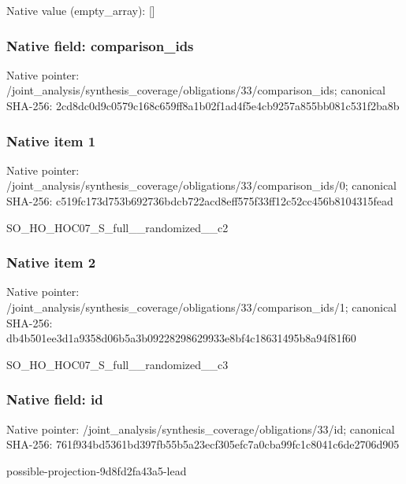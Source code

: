 \documentclass[10pt,a4paper]{article}
\begin{document}
Native value (empty\_\allowbreak{}array): []

\subsubsection{Native field: comparison\_\allowbreak{}ids}
Native pointer: /joint\_\allowbreak{}analysis/synthesis\_\allowbreak{}coverage/obligations/33/comparison\_\allowbreak{}ids; canonical SHA-256: 2cd8dc0d9c0579c168c659ff8a1b02f1ad4f5e4cb9257a855bb081c531f2ba8b

\subsubsection{Native item 1}
Native pointer: /joint\_\allowbreak{}analysis/synthesis\_\allowbreak{}coverage/obligations/33/comparison\_\allowbreak{}ids/0; canonical SHA-256: c519fc173d753b692736bdcb722acd8eff575f33ff12c52cc456b8104315fead

\begingroup\raggedright\sloppy SO\_\allowbreak{}HO\_\allowbreak{}HOC07\_\allowbreak{}S\_\allowbreak{}full\_\allowbreak{}\_\allowbreak{}randomized\_\allowbreak{}\_\allowbreak{}c2\par\endgroup

\subsubsection{Native item 2}
Native pointer: /joint\_\allowbreak{}analysis/synthesis\_\allowbreak{}coverage/obligations/33/comparison\_\allowbreak{}ids/1; canonical SHA-256: db4b501ee3d1a9358d06b5a3b09228298629933e8bf4c18631495b8a94f81f60

\begingroup\raggedright\sloppy SO\_\allowbreak{}HO\_\allowbreak{}HOC07\_\allowbreak{}S\_\allowbreak{}full\_\allowbreak{}\_\allowbreak{}randomized\_\allowbreak{}\_\allowbreak{}c3\par\endgroup

\subsubsection{Native field: id}
Native pointer: /joint\_\allowbreak{}analysis/synthesis\_\allowbreak{}coverage/obligations/33/id; canonical SHA-256: 761f934bd5361bd397fb55b5a23ecf305efc7a0cba99fc1c8041c6de2706d905

\begingroup\raggedright\sloppy possible-projection-9d8fd2fa43a5-lead\par\endgroup
\end{document}
